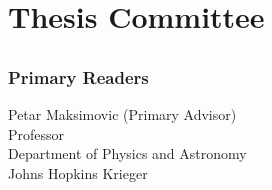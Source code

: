\chapter*{Thesis Committee}

\section*{}
\subsection*{Primary Readers}

\begin{singlespace}


\indent Petar Maksimovic (Primary Advisor)\\
\indent \indent Professor \\
\indent \indent Department of Physics and Astronomy\\
\indent \indent  Johns Hopkins Krieger \\










\end{singlespace}


